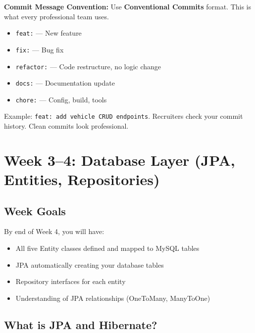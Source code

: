 \documentclass[12pt,a4paper]{report}
\newcommand{\code}[1]{\texttt{\textcolor{keywordblue}{#1}}}
\begin{document}
\begin{tcolorbox}[notebox]
\textbf{Commit Message Convention:} Use \textbf{Conventional Commits} format. This is what every professional team uses.
\begin{itemize}
  \item \code{feat:} --- New feature
  \item \code{fix:} --- Bug fix
  \item \code{refactor:} --- Code restructure, no logic change
  \item \code{docs:} --- Documentation update
  \item \code{chore:} --- Config, build, tools
\end{itemize}
Example: \code{feat: add vehicle CRUD endpoints}. Recruiters check your commit history. Clean commits look professional.
\end{tcolorbox}

\chapter{Week 3--4: Database Layer (JPA, Entities, Repositories)}

\section{Week Goals}

By end of Week 4, you will have:
\begin{itemize}
  \item All five Entity classes defined and mapped to MySQL tables
  \item JPA automatically creating your database tables
  \item Repository interfaces for each entity
  \item Understanding of JPA relationships (OneToMany, ManyToOne)
\end{itemize}

\section{What is JPA and Hibernate?}
\end{document}
